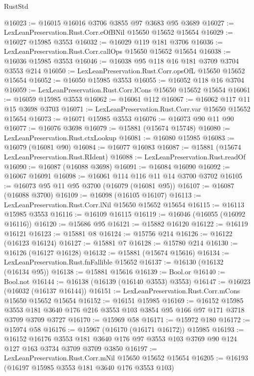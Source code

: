 \begin{lexlean}{RustStd}
\begin{coremodule}
@16023 := @16015 @16016 @3706 @3855 @97 @3683 @95 @3689
@16027 := LexLeanPreservation.Rust.Corr.eOfBNil @15650 @15652 @15654
@16029 := @16027 @15985 @3553
@16032 := @16029 @119 @181 @3706
@16036 := LexLeanPreservation.Rust.Corr.callOps @15650 @15652 @15654
@16038 := @16036 @15985 @3553
@16046 := @16038 @95 @118 @16 @181 @3709 @3704 @3553 @214
@16050 := LexLeanPreservation.Rust.Corr.opsOfL @15650 @15652 @15654
@16052 := @16050 @15985 @3553
@16055 := @16052 @118 @16 @3704
@16059 := LexLeanPreservation.Rust.Corr.lCons @15650 @15652 @15654
@16061 := @16059 @15985 @3553
@16062 := @16061 @112
@16067 := @16062 @117 @11 @15 @3698 @3703
@16071 := LexLeanPreservation.Rust.Corr.var @15650 @15652 @15654
@16073 := @16071 @15985 @3553
@16076 := @16073 @90 @11 @90
@16077 := @16076 @3698
@16079 := @15881 (@15674 @15748)
@16080 := LexLeanPreservation.Rust.ctxLookup
@16081 := @16080 @15985
@16083 := @16079 (@16081 @90)
@16084 := @16077 @16083
@16087 := @15881 (@15674 LexLeanPreservation.Rust.RIdent)
@16088 := LexLeanPreservation.Rust.readOf
@16090 := @16087 (@16088 @3698)
@16091 := @16084 @16090
@16092 := @16067 @16091
@16098 := @16061 @114 @116 @11 @14 @3700 @3702
@16105 := @16073 @95 @11 @95 @3700 (@16079 (@16081 @95))
@16107 := @16087 (@16088 @3700)
@16109 := @16098 (@16105 @16107)
@16113 := LexLeanPreservation.Rust.Corr.lNil @15650 @15652 @15654
@16115 := @16113 @15985 @3553
@16116 := @16109 @16115
@16119 := @16046 (@16055 (@16092 @16116))
@16120 := @15686 @95
@16121 := @15882 @16120
@16122 := @16119 @16121
@16123 := @15881 @8
@16124 := @15756 @214
@16126 := @16122 (@16123 @16124)
@16127 := @15881 @7
@16128 := @15780 @214
@16130 := @16126 (@16127 @16128)
@16132 := @15881 (@15674 @15616)
@16134 := LexLeanPreservation.Rust.fnFallible @15652
@16137 := @16130 (@16132 (@16134 @95))
@16138 := @15881 @15616
@16139 := Bool.or
@16140 := Bool.not
@16144 := @16138 (@16139 (@16140 @3553) @3553)
@16147 := @16023 (@16032 (@16137 @16144))
@16151 := LexLeanPreservation.Rust.Corr.mCons @15650 @15652 @15654
@16152 := @16151 @15985
@16169 := @16152
    @15985
    @3553
    @181
    @3640
    @176
    @216
    @3553
    @103
    @3854
    @95
    @166
    @97
    @171
    @3718
    @3709
    @3709
    @3727
@16170 := @15969 @58
@16171 := @15972 @180
@16172 := @15974 @58
@16176 := @15967 (@16170 (@16171 @16172)) @15985
@16193 := @16152
    @16176
    @3553
    @181
    @3640
    @176
    @97
    @3553
    @103
    @3769
    @90
    @124
    @127
    @163
    @3734
    @3709
    @3709
    @3850
@16197 := LexLeanPreservation.Rust.Corr.mNil @15650 @15652 @15654
@16205 := @16193 (@16197 @15985 @3553 @181 @3640 @176 @3553 @103)

\end{coremodule}
\end{lexlean}
